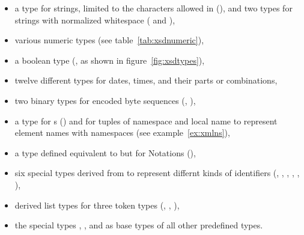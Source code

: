 \begin{itemize}
 \item a type for  strings, limited to the characters allowed
       in  (), and two types for strings with normalized
	   whitespace ( and ),
 \item various numeric types (see table~\ref{tab:xsdnumeric}),
 \item a boolean type (, as shown in figure~\ref{fig:xsdtypes}),
 \item twelve different types for dates, times, and their parts or combinations,
 \item two binary types for encoded byte sequences (, ),
 \item a type for s () and for tuples of namespace
        and local name to represent  element names with 
	   namespaces (see example~\ref{ex:xmlns}),
 \item a type defined equivalent to  but for  Notations
       (),
 \item six special types derived from  to represent differnt kinds of
       identifiers (, , , , 
	   , ),
 \item derived list types for three token types (,
  , ),
 \item the special types , , and 
   as base types of all other predefined types.
\end{itemize}


